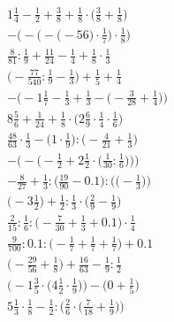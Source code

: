 \documentclass[8pt]{article}
\begin{document}
\begin{align}
1\frac{1}{4} - \frac{1}{2} + \frac{3}{8} + \frac{1}{8} \cdot \big(\frac{3}{8} + \frac{1}{8}\big) \\
-\bigg(-\Big(-\big(-56\big) \cdot \frac{1}{7}\Big) \cdot \frac{1}{8}\bigg) \\
\frac{8}{81} : \frac{1}{9} + \frac{11}{24} - \frac{1}{4} + \frac{1}{8} \cdot \frac{1}{3} \\
\big(-\frac{77}{540} : \frac{1}{9} - \frac{1}{3}\big) + \frac{1}{5} + \frac{1}{4} \\
-\Big(-1\frac{1}{7} - \frac{1}{3} + \frac{1}{3} - \big(-\frac{3}{28} + \frac{1}{4}\big)\Big) \\
8\frac{5}{6} + \frac{1}{24} + \frac{1}{8} \cdot \big(2\frac{6}{9} \cdot \frac{1}{4} \cdot \frac{1}{6}\big) \\
\frac{48}{63} \cdot \frac{1}{3} - \big(1 \cdot \frac{1}{9}\big) : \big(-\frac{4}{21} + \frac{1}{3}\big) \\
-\bigg(-\Big(-\frac{1}{2} + 2\frac{1}{2} \cdot \big(\frac{1}{30} : \frac{1}{6}\big)\Big)\bigg) \\
-\frac{8}{27} + \frac{1}{3} : \Big(\frac{19}{90} - 0.1\Big) : \Big(\big(-\frac{1}{3}\big)\Big) \\
\big(-3\frac{1}{2}\big) + \frac{1}{2} : \frac{1}{3} \cdot \big(\frac{2}{9} - \frac{1}{9}\big) \\
\frac{2}{15} : \frac{1}{6} : \big(-\frac{7}{30} + \frac{1}{3} + 0.1\big) \cdot \frac{1}{4} \\
\frac{9}{700} : 0.1 : \big(-\frac{1}{7} + \frac{1}{7} + \frac{1}{7}\big) + 0.1 \\
\big(-\frac{29}{56} + \frac{1}{8}\big) + \frac{16}{63} - \frac{1}{9} : \frac{1}{2} \\
\Big(-1\frac{3}{5} \cdot \big(4\frac{1}{2} \cdot \frac{1}{9}\big)\Big) - \Big(0 + \frac{1}{5}\Big) \\
5\frac{1}{3} \cdot \frac{1}{8} - \frac{1}{2} : \Big(\frac{2}{6} \cdot \big(\frac{7}{18} + \frac{1}{9}\big)\Big)
\end{align}
\end{document}
